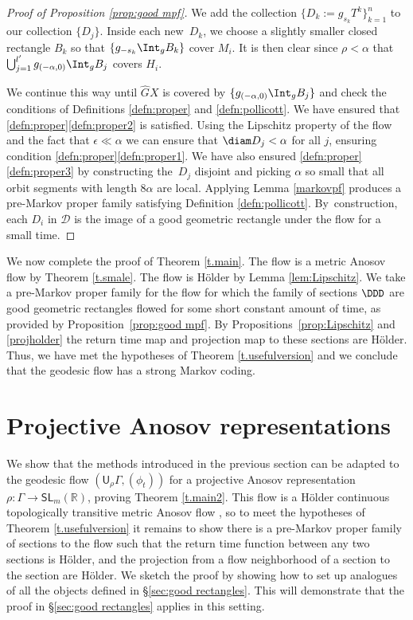 \begin{proof}[Proof of Proposition \ref{prop:good mpf}]
We add the collection $\{ D_k\!:=\!g_{s_k}T^k \}_{k=1}^n$ to our collection $\{D_j\}$. Inside each new~$D_k$, we choose a slightly smaller closed rectangle $B_k$ so that $\{ g_{-s_k} \Int_g B_k \}$ cover $M_i$. It is then clear since $\rho<\alpha$ that $\bigcup_{j=1}^{l'} g_{(-\alpha,0)} \Int_g B_j$ covers $H_i$.

We continue this way until $\hat GX$ is covered by $\{ g_{(-\alpha,0)} \Int_g B_j \}$ and check the conditions of Definitions \ref{defn:proper} and \ref{defn:pollicott}. We have ensured that \ref{defn:proper}\eqref{defn:proper2} is satisfied. Using the Lipschitz property of the flow and the fact that $\epsilon \ll  \alpha$ we can ensure that $\diam D_j < \alpha$ for all $j$, ensuring condition \ref{defn:proper}\eqref{defn:proper1}. We have also ensured \ref{defn:proper}\eqref{defn:proper3} by constructing the~$D_j$ disjoint and picking $\alpha$ so small that all orbit segments with length $8\alpha$ are local. \hbox{Applying} Lemma \ref{markovpf} produces a pre-Markov proper family satisfying Definition \ref{defn:pollicott}. By~construction, each $D_i$ in $\mathcal{D}$ is the image of a good geometric rectangle under the flow for a small time.
\end{proof}

We now complete the proof of Theorem \ref{t.main}. The flow is a metric Anosov flow by Theorem \ref{t.smale}. The flow is Hölder by Lemma \ref{lem:Lipschitz}. We take a pre-Markov proper family for the flow for which the family of sections $\DDD$ are good geometric rectangles flowed for some short constant amount of time, as provided by Proposition~\ref{prop:good mpf}. By Propositions~\ref{prop:Lipschitz} and \ref{projholder} the return time map and projection map to these sections are Hölder. Thus, we have met the hypotheses of Theorem \ref{t.usefulversion} and we conclude that the geodesic flow has a strong Markov coding.

\section{Projective Anosov representations} \label{sec:twoexamples}

We show that the methods introduced in the previous section can be adapted to the geodesic flow $(\mathsf{U}_\rho\Gamma, (\phi_t))$ for a projective Anosov representation $\rho: \Gamma \to \mathsf{SL}_m(\mathbb{R})$, proving Theorem \ref{t.main2}. This flow is a Hölder continuous topologically transitive metric Anosov flow \cite[Prop.\,5.1]{bcls}, so to meet the hypotheses of Theorem \ref{t.usefulversion} it remains to show there is a pre-Markov proper family of sections to the flow such that the return time function between any two sections is Hölder, and the projection from a flow neighborhood of a section to the section are Hölder. We sketch the proof by showing how to set up analogues of all the objects defined in \S \ref{sec:good rectangles}. This will demonstrate that the proof in \S \ref{sec:good rectangles} applies in this setting.

